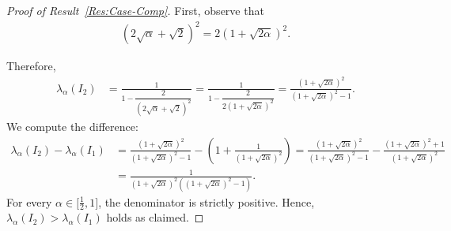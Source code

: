 \documentclass[%
english, titlepage=false %
]{./tum-templates/book/tumbook}
\begin{document}
\label{app:proof-cases}
\begin{proof}[Proof of Result~\ref{Res:Case-Comp}]

First, observe that
\begin{align*}
\left(2\sqrt{\alpha}+\sqrt{2}\right)^2=
2\left(1+\sqrt{2\alpha}\right)^2.
\end{align*}

Therefore,
\begin{align*}
\lambda_{\alpha}(I_{2})
&=
\frac{1}{
1-\dfrac{2}{\left(2\sqrt{\alpha}+\sqrt{2}\right)^2}
}
=
\frac{1}{
1-\dfrac{2}{2\left(1+\sqrt{2\alpha}\right)^2}
}
=
\frac{\left(1+\sqrt{2\alpha}\right)^2}
{\left(1+\sqrt{2\alpha}\right)^2-1}.
\end{align*}
We compute the difference:
\begin{align*}
\lambda_{\alpha}(I_{2})-\lambda_{\alpha}(I_{1})
&=
\frac{\left(1+\sqrt{2\alpha}\right)^2}
{\left(1+\sqrt{2\alpha}\right)^2-1}
-
\left(
1+\frac{1}{\left(1+\sqrt{2\alpha}\right)^2}
\right)
=
\frac{\left(1+\sqrt{2\alpha}\right)^2}
{\left(1+\sqrt{2\alpha}\right)^2-1}
-
\frac{\left(1+\sqrt{2\alpha}\right)^2+1}
{\left(1+\sqrt{2\alpha}\right)^2}\\
&=
\frac{1}{
\left(1+\sqrt{2\alpha}\right)^2
\left(
\left(1+\sqrt{2\alpha}\right)^2-1
\right)
}.
\end{align*}
For every \(\alpha\in\Big[\frac12,1\Big]\), the denominator is strictly positive.
Hence, \(\lambda_{\alpha}(I_2)>\lambda_{\alpha}(I_1)\) holds as claimed.
\end{proof}
\end{document}
